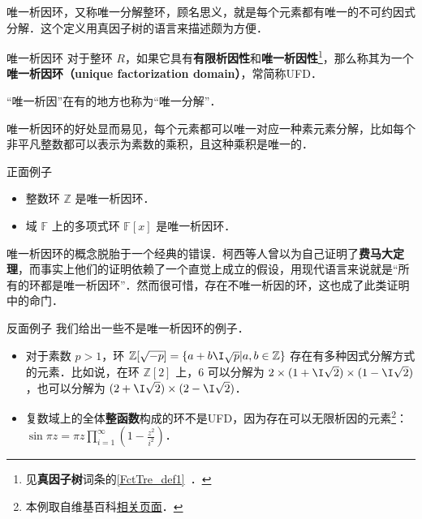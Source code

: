 


唯一析因环，又称唯一分解整环，顾名思义，就是每个元素都有唯一的不可约因式分解．这个定义用真因子树的语言来描述颇为方便．

\begin{definition}{唯一析因环}
对于整环 $R$，如果它具有\textbf{有限析因性}和\textbf{唯一析因性}\footnote{见\textbf{真因子树}词条的\autoref{FctTre_def1}~．}，那么称其为一个\textbf{唯一析因环（unique factorization domain）}，常简称UFD．
\end{definition}

“唯一析因”在有的地方也称为“唯一分解”．

唯一析因环的好处显而易见，每个元素都可以唯一对应一种素元素分解，比如每个非平凡整数都可以表示为素数的乘积，且这种乘积是唯一的．

\begin{example}{正面例子}
\begin{itemize}
\item 整数环 $\mathbb{Z}$ 是唯一析因环．
\item 域 $\mathbb{F}$ 上的多项式环 $\mathbb{F}[x]$ 是唯一析因环．
\end{itemize}
\end{example}

唯一析因环的概念脱胎于一个经典的错误．柯西等人曾以为自己证明了\textbf{费马大定理}，而事实上他们的证明依赖了一个直觉上成立的假设，用现代语言来说就是“所有的环都是唯一析因环”．然而很可惜，存在不唯一析因的环，这也成了此类证明中的命门．

\begin{example}{反面例子}
我们给出一些不是唯一析因环的例子．
\begin{itemize}
\item 对于素数 $p>1$，环 $\mathbb{Z}[\sqrt{-p}]=\{a+b\I\sqrt{p}|a, b\in\mathbb{Z}\}$ 存在有多种因式分解方式的元素．比如说，在环 $\mathbb{Z}[2]$ 上，$6$ 可以分解为 $2\times (1+\I\sqrt{2})\times(1-\I\sqrt{2})$，也可以分解为 $(2+\I\sqrt{2})\times(2-\I\sqrt{2})$．
\item 复数域上的全体\textbf{整函数}构成的环不是UFD，因为存在可以无限析因的元素\footnote{本例取自维基百科\href{https://en.wikipedia.org/wiki/Unique_factorization_domain}{相关页面}．}：$\sin{\pi z=\pi z\prod\limits_{i=1}^\infty(1-\frac{z^2}{i^2})}$．
\end{itemize}
\end{example}

